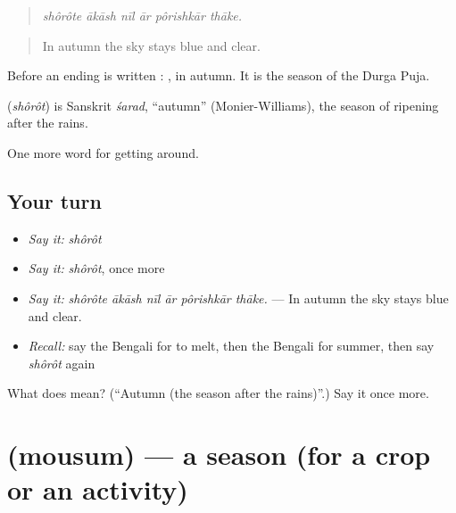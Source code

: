 \begin{quote}
     
\end{quote}

\begin{quote}
\emph{shôrôte ākāsh nīl ār pôrishkār thāke.}
\end{quote}

\begin{quote}
In autumn the sky stays blue and clear.
\end{quote}

Before an ending  is written : , in autumn. It is the season of the Durga Puja.

\begin{cousinweb}
\textbf{} (\emph{shôrôt}) is Sanskrit \emph{śarad}, \textquotedblleft{}autumn\textquotedblright{} (Monier-Williams), the season of ripening after the rains.
\end{cousinweb}

\begin{grammarlens}[title={What you've built}]
One more word for getting around.
\end{grammarlens}

\subsection*{Your turn}
\begin{itemize}
\raggedright
  \item \emph{Say it:} \emph{shôrôt}
  \item \emph{Say it:} \emph{shôrôt}, once more
  \item \emph{Say it:} \emph{shôrôte ākāsh nīl ār pôrishkār thāke.} — In autumn the sky stays blue and clear.
  \item \emph{Recall:} say the Bengali for to melt, then the Bengali for summer, then say \emph{shôrôt} again
\end{itemize}

\begin{tcolorbox}[breakable,colback=teal!4,colframe=teal!35!black,title={Before you move on}]
What does  mean? (\textquotedblleft{}Autumn (the season after the rains)\textquotedblright{}.) Say it once more.
\end{tcolorbox}
\section[\texorpdfstring{\bn{মৌসুম} (mousum)}{মৌসুম (mousum)}]{ (mousum) — a season (for a crop or an activity)}


